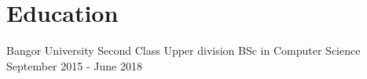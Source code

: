 \documentclass{my_cv}
\begin{document}






\section{Education}
\educationDetails
{Bangor University}
{Second Class Upper division BSc in Computer Science}
{September 2015 - June 2018}
\medskip



%
%
%
%
%
%
%

\end{document}
